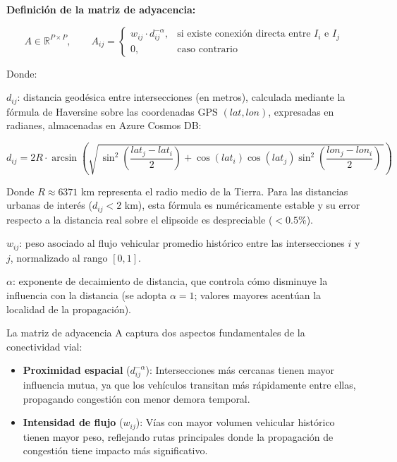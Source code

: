 \documentclass[12pt,a4paper,oneside]{report}
\begin{document}
\textbf{Definición de la matriz de adyacencia:}

\begin{equation}
A \in \mathbb{R}^{P \times P}, \qquad
A_{ij} =
\begin{cases}
w_{ij} \cdot d_{ij}^{-\alpha}, & \text{si existe conexión directa entre } I_{i} \text{ e } I_{j}\\[2pt]
0, & \text{caso contrario}
\end{cases}
\label{eq:adyacencia}
\end{equation}

Donde:

\(d_{ij}\): distancia geodésica entre intersecciones (en metros), calculada mediante la fórmula de Haversine sobre las coordenadas GPS \((lat, lon)\), expresadas en radianes, almacenadas en Azure Cosmos DB:

\begin{equation}
d_{ij} = 2R \cdot \arcsin\!\left( \sqrt{\, \sin^{2}\!\left(\frac{lat_{j} - lat_{i}}{2}\right) + \cos(lat_{i})\cos(lat_{j})\sin^{2}\!\left(\frac{lon_{j} - lon_{i}}{2}\right) \,} \right)
\label{eq:haversine}
\end{equation}

Donde \(R \approx 6371\) km representa el radio medio de la Tierra. Para las distancias urbanas de interés (\(d_{ij} < 2\) km), esta fórmula es numéricamente estable y su error respecto a la distancia real sobre el elipsoide es despreciable (\(< 0.5\%\)).

\(w_{ij}\): peso asociado al flujo vehicular promedio histórico entre las intersecciones \(i\) y \(j\), normalizado al rango \([0,1]\).

\(\alpha\): exponente de decaimiento de distancia, que controla cómo disminuye la influencia con la distancia (se adopta \(\alpha = 1\); valores mayores acentúan la localidad de la propagación).

La matriz de adyacencia A captura dos aspectos fundamentales de la conectividad vial:

\begin{itemize}
\item
  \textbf{Proximidad espacial} (\(d_{ij}^{- \alpha}\)): Intersecciones más cercanas tienen mayor influencia mutua, ya que los vehículos transitan más rápidamente entre ellas, propagando congestión con menor demora temporal.
\item
  \textbf{Intensidad de flujo} (\(w_{ij}\)): Vías con mayor volumen vehicular histórico tienen mayor peso, reflejando rutas principales donde la propagación de congestión tiene impacto más significativo.
\end{itemize}
\end{document}
